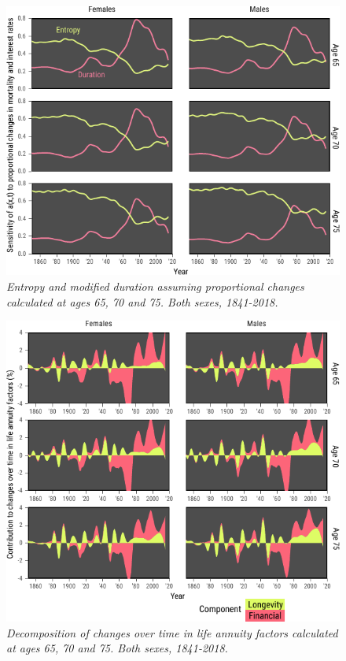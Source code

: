 \documentclass[12pt]{article}
\begin{document}
\begin{figure}[!ht]
	\centering
	\includegraphics[width=1\textwidth]{Fig/FigA3}
	\caption{\textit{Entropy and modified duration assuming proportional changes calculated at ages 65, 70 and 75. Both sexes, 1841-2018.}}
	\label{fig:FigA3}
\end{figure}






\begin{figure}[!ht]
	\centering
	\includegraphics[width=1\textwidth]{Fig/FigA4}
	\caption{\textit{Decomposition of changes over time in life annuity factors calculated at ages 65, 70 and 75. Both sexes, 1841-2018.}}
	\label{fig:FigA4}
\end{figure}
\end{document}
